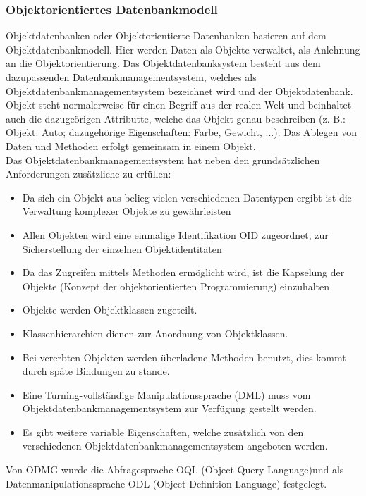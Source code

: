 \documentclass[12pt,a4paper]{report}
\begin{document}
\begin{onehalfspace}
\subsubsection{Objektorientiertes Datenbankmodell}
Objektdatenbanken oder Objektorientierte Datenbanken basieren auf dem Objektdatenbankmodell. Hier werden Daten als Objekte verwaltet, als Anlehnung an die Objektorientierung. Das Objektdatenbanksystem besteht aus dem dazupassenden Datenbankmanagementsystem, welches als Objektdatenbankmanagementsystem bezeichnet wird und der Objektdatenbank.\\

Objekt steht normalerweise für einen Begriff aus der realen Welt und beinhaltet auch die dazugeörigen Attributte, welche das Objekt genau beschreiben (z. B.: Objekt: Auto; dazugehörige Eigenschaften: Farbe, Gewicht, ...). Das Ablegen von Daten und Methoden erfolgt gemeinsam in einem Objekt.\\

Das Objektdatenbankmanagementsystem hat neben den grundsätzlichen Anforderungen zusätzliche zu erfüllen:
\begin{itemize}
\item Da sich ein Objekt aus belieg vielen verschiedenen Datentypen ergibt ist die Verwaltung komplexer Objekte zu gewährleisten
\item Allen Objekten wird eine einmalige Identifikation OID zugeordnet, zur Sicherstellung der einzelnen Objektidentitäten
\item Da das Zugreifen mittels Methoden ermöglicht wird, ist die Kapselung der Objekte (Konzept der objektorientierten Programmierung) einzuhalten
\item Objekte werden Objektklassen zugeteilt.
\item Klassenhierarchien dienen zur Anordnung von Objektklassen.
\item Bei vererbten Objekten werden überladene Methoden benutzt, dies kommt durch späte Bindungen zu stande.
\item Eine Turning-vollständige Manipulationssprache (DML) muss vom Objektdatenbankmanagementsystem zur Verfügung gestellt werden.
\item Es gibt weitere variable Eigenschaften, welche zusätzlich von den verschiedenen Objektdatenbankmanagementsystem angeboten werden.
\end{itemize}
Von ODMG wurde die Abfragesprache OQL (Object Query Language)und als Datenmanipulationssprache ODL (Object Definition Language) festgelegt.


\end{onehalfspace}
\end{document}
